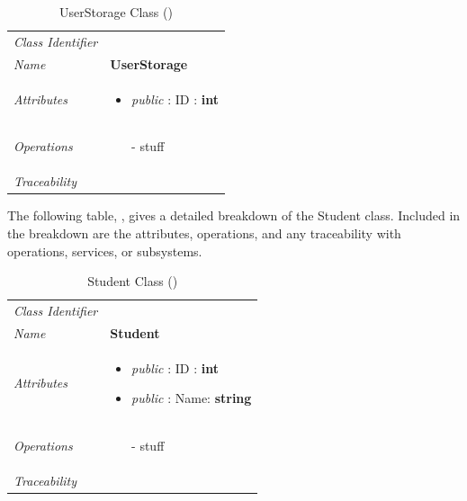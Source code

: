 \documentclass[12pt,letterpaper]{article}
\begin{document}
\begin{table}[H]
    \caption{UserStorage Class ()} 
	\begin{tabu} to 
		\toprule
		Class Identifier &  \\
		Name & {\bf UserStorage} \\
		Attributes & 
		\begin{minipage}[t]{\linewidth}
		    \begin{itemize}
		        \item \textit{public} : ID : \bf{int}
			\end{itemize}
	    \end{minipage} \\

		Operations &
		\begin{minipage}[t]{\linewidth}
			\begin{enumerate}
			    \item[-] stuff
	        \end{enumerate}
	    \end{minipage} \\
	    	Traceability & \\
		\toprule
	\end{tabu}
\end{table}

The following table, , gives a detailed breakdown of the Student class. Included in the breakdown are the attributes, operations, and any traceability with operations, services, or subsystems.

\begin{table}[H]
    \caption{Student Class ()} 
	\begin{tabu} to 
		\toprule
		Class Identifier &  \\
		Name & {\bf Student} \\
		Attributes & 
		\begin{minipage}[t]{\linewidth}
		    \begin{itemize}
		        \item \textit{public} : ID : {\bf int}
		        \item \textit{public} : Name: {\bf string}
			\end{itemize}
	    \end{minipage} \\

		Operations &
		\begin{minipage}[t]{\linewidth}
			\begin{enumerate}
			    \item[-] stuff
	        \end{enumerate}
	    \end{minipage} \\
	    	Traceability & \\
		\toprule
	\end{tabu}
\end{table}
\end{document}
